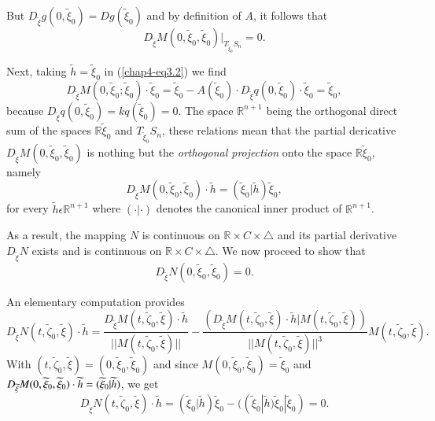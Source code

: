 But $D_{\widetilde{\xi}}g(0, \widetilde{\xi}_{0}) =
Dg(\widetilde{\xi}_{0})$ and by definition of $A$, it follows that
$$
D_{\widetilde{\xi}}M(0, \widetilde{\xi}_{0}, \widetilde{\xi}_{0})
|_{T_{\widetilde{\xi}_{0}}S_{n}} = 0.
$$\pageoriginale

Next, taking $\widetilde{h} = \widetilde{\xi}_{0}$ in
(\ref{chap4-eq3.2}) we find
$$
D_{\widetilde{\xi}}M(0, \widetilde{\xi}_{0} ; \widetilde{\xi}_{0})
\cdot \widetilde{\xi}_{0} = \widetilde{\xi}_{0} -
A(\widetilde{\xi}_{0}) \cdot D_{\widetilde{\xi}}q(0,
\widetilde{\xi}_{0}) \cdot \widetilde{\xi}_{0} = \widetilde{\xi}_{0},
$$
because $D_{\widetilde{\xi}}q(0, \widetilde{\xi}_{0}) =
kq(\widetilde{\xi}_{0}) = 0$. The space $\mathbb{R}^{n+1}$ being the
orthogonal direct sum of the spaces $\mathbb{R}\widetilde{\xi}_{0}$
and $T_{\widetilde{\xi}_{0}}S_{n}$, these relations mean that the
partial dericative $D_{\widetilde{\xi}}M(0, \widetilde{\xi}_{0},
\widetilde{\xi}_{0})$ is nothing but the {\em orthogonal projection}
onto the space $\mathbb{R}\widetilde{\xi}_{0}$, namely
$$
D_{\widetilde{\xi}}M(0, \widetilde{\xi}_{0}, \widetilde{\xi}_{0})
\cdot \widetilde{h} = (\widetilde{\xi}_{0} | \widetilde{h})\widetilde{\xi}_{0},
$$
for every $\widetilde{h} \epsilon \mathbb{R}^{n+1}$ where $(\cdot |
\cdot)$ denotes the canonical inner product of $\mathbb{R}^{n+1}$.

As a result, the mapping $N$ is continuous on $\mathbb{R} \times C
\times \triangle$ and its partial derivative $D_{\widetilde{\xi}}N$
exists and is continuous on $\mathbb{R} \times C \times \triangle$. We
now proceed to show that
$$
D_{\widetilde{\xi}}N(0, \widetilde{\xi}_{0}, \widetilde{\xi}_{0}) = 0.
$$

An elementary computation provides
{\fontsize{10}{12}\selectfont
$$
D_{\widetilde{\xi}}N(t, \widetilde{\zeta}_{0}, \widetilde{\xi}) \cdot
\widetilde{h} = \frac{D_{\widetilde{\xi}}M(t, \widetilde{\zeta}_{0},
  \widetilde{\xi})\cdot \widetilde{h}}{||M(t, \widetilde{\zeta}_{0},
  \widetilde{\xi})||} - \frac{(D_{\widetilde{\xi}}M(t,
  \widetilde{\zeta}_{0}, \widetilde{\xi})\cdot \widetilde{h} |M(t,
  \widetilde{\zeta}_{0}, \widetilde{\xi}))}{||M(t,
  \widetilde{\zeta}_{0}, \widetilde{\xi})||^{3}} M(t,
\widetilde{\zeta}_{0}, \widetilde{\xi}).
$$}
With $(t, \widetilde{\zeta}_{0}, \widetilde{\xi}) = (0,
\widetilde{\xi}_{0}, \widetilde{\xi}_{0})$ and since $M(0,
\widetilde{\xi}_{0}, \widetilde{\xi}_{0}) = \widetilde{\xi}_{0}$ and
$D_{\widetilde{\xi}}M(0,\break \widetilde{\xi}_{0}, \widetilde{\xi}_{0})
\cdot \widetilde{h} = (\widetilde{\xi}_{0} | \widetilde{h})$, we get
$$
D_{\widetilde{\xi}}N(t, \widetilde{\zeta}_{0}, \widetilde{\xi}) \cdot
\widetilde{h} = (\widetilde{\xi}_{0} |
\widetilde{h})\widetilde{\xi}_{0} - ((\widetilde{\xi}_{0} |
\widetilde{h})\widetilde{\xi}_{0} | \widetilde{\xi}_{0}) = 0.
$$

